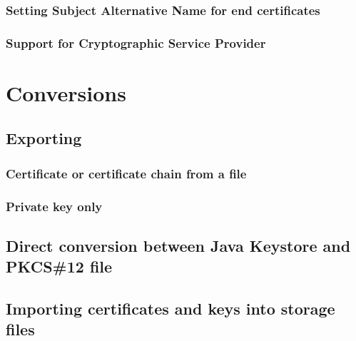 \documentclass[10pt, a4paper]{report}
\begin{document}
    \subsubsection{Setting Subject Alternative Name for end certificates}
    
    \subsubsection{Support for Cryptographic Service Provider}
    
\section{Conversions}

  \subsection{Exporting}
  
    \subsubsection{Certificate or certificate chain from a file}
    
    \subsubsection{Private key only}
    
  \subsection{Direct conversion between Java Keystore and PKCS\#12 file}
  
  \subsection{Importing certificates and keys into storage files}
  
\end{document}
